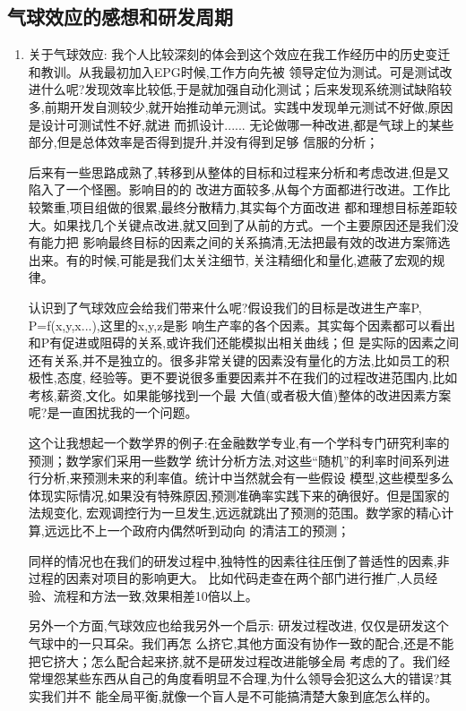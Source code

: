\documentclass[11pt]{article}
\begin{document}
\subsection{气球效应的感想和研发周期}
\begin{staff}
\qlogo 
\begin{enumerate}
  \item 关于气球效应:
    我个人比较深刻的体会到这个效应在我工作经历中的历史变迁和教训。从我最初加入EPG时候,工作方向先被
    领导定位为测试。可是测试改进什么呢?发现效率比较低,于是就加强自动化测试；后来发现系统测试缺陷较
    多,前期开发自测较少,就开始推动单元测试。实践中发现单元测试不好做,原因是设计可测试性不好,就进
    而抓设计...... 无论做哪一种改进,都是气球上的某些部分,但是总体效率是否得到提升,并没有得到足够
    信服的分析；

    后来有一些思路成熟了,转移到从整体的目标和过程来分析和考虑改进,但是又陷入了一个怪圈。影响目的的
    改进方面较多,从每个方面都进行改进。工作比较繁重,项目组做的很累,最终分散精力,其实每个方面改进
    都和理想目标差距较大。如果找几个关键点改进,就又回到了从前的方式。一个主要原因还是我们没有能力把
    影响最终目标的因素之间的关系搞清,无法把最有效的改进方案筛选出来。有的时候,可能是我们太关注细节,
    关注精细化和量化,遮蔽了宏观的规律。

    认识到了气球效应会给我们带来什么呢?假设我们的目标是改进生产率P, P=f(x,y,x...),这里的x,y,z是影
    响生产率的各个因素。其实每个因素都可以看出和P有促进或阻碍的关系,或许我们还能模拟出相关曲线；但
    是实际的因素之间还有关系,并不是独立的。很多非常关键的因素没有量化的方法,比如员工的积极性,态度,
    经验等。更不要说很多重要因素并不在我们的过程改进范围内,比如考核,薪资,文化。如果能够找到一个最
    大值(或者极大值)整体的改进因素方案呢?是一直困扰我的一个问题。

    这个让我想起一个数学界的例子:在金融数学专业,有一个学科专门研究利率的预测；数学家们采用一些数学
    统计分析方法,对这些``随机''的利率时间系列进行分析,来预测未来的利率值。统计中当然就会有一些假设
    模型,这些模型多么体现实际情况,如果没有特殊原因,预测准确率实践下来的确很好。但是国家的法规变化,
    宏观调控行为一旦发生,远远就跳出了预测的范围。数学家的精心计算,远远比不上一个政府内偶然听到动向
    的清洁工的预测；

    同样的情况也在我们的研发过程中,独特性的因素往往压倒了普适性的因素,非过程的因素对项目的影响更大。
    比如代码走查在两个部门进行推广,人员经验、流程和方法一致,效果相差10倍以上。  

    另外一个方面,气球效应也给我另外一个启示: 研发过程改进, 仅仅是研发这个气球中的一只耳朵。我们再怎
    么挤它,其他方面没有协作一致的配合,还是不能把它挤大；怎么配合起来挤,就不是研发过程改进能够全局
    考虑的了。我们经常埋怨某些东西从自己的角度看明显不合理,为什么领导会犯这么大的错误?其实我们并不
    能全局平衡,就像一个盲人是不可能搞清楚大象到底怎么样的。   



\end{enumerate}
\end{staff}
\end{document}
